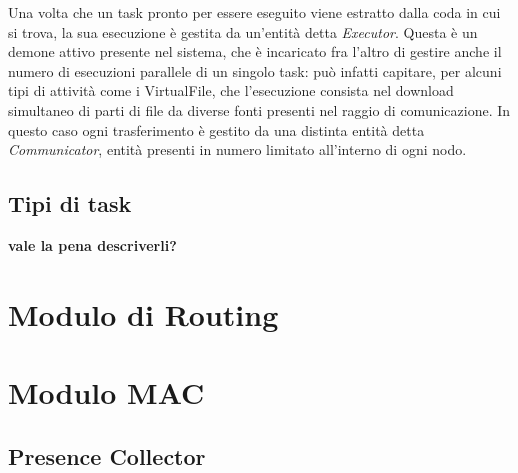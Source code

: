 Una volta che un task pronto per essere eseguito viene estratto dalla coda in cui si trova, la sua esecuzione è gestita da un'entità detta \textit{Executor}. Questa è un demone attivo presente nel sistema, che è incaricato fra l'altro di gestire anche il numero di esecuzioni parallele di un singolo task: può infatti capitare, per alcuni tipi di attività come i VirtualFile, che l'esecuzione consista nel download simultaneo di parti di file da diverse fonti presenti nel raggio di comunicazione. In questo caso ogni trasferimento è gestito da una distinta entità detta \textit{Communicator}, entità presenti in numero limitato all'interno di ogni nodo.

\subsection{Tipi di task}
\textbf{vale la pena descriverli?}

\section{Modulo di Routing}
\section{Modulo MAC}

\subsection{Presence Collector} 
\label{descrPresenceCollector}
 

